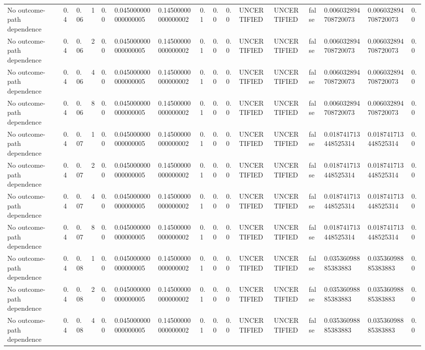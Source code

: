 \begin{tabular}{llllllllllllllll}
No outcome-path dependence & 0.4 & 0.06 & 1 & 0.0 & 0.045000000000000005 & 0.14500000000000002 & 0.1 & 0.0 & 0.0 & UNCERTIFIED & UNCERTIFIED & false & 0.006032894708720073 & 0.006032894708720073 & 0.0 \\
No outcome-path dependence & 0.4 & 0.06 & 2 & 0.0 & 0.045000000000000005 & 0.14500000000000002 & 0.1 & 0.0 & 0.0 & UNCERTIFIED & UNCERTIFIED & false & 0.006032894708720073 & 0.006032894708720073 & 0.0 \\
No outcome-path dependence & 0.4 & 0.06 & 4 & 0.0 & 0.045000000000000005 & 0.14500000000000002 & 0.1 & 0.0 & 0.0 & UNCERTIFIED & UNCERTIFIED & false & 0.006032894708720073 & 0.006032894708720073 & 0.0 \\
No outcome-path dependence & 0.4 & 0.06 & 8 & 0.0 & 0.045000000000000005 & 0.14500000000000002 & 0.1 & 0.0 & 0.0 & UNCERTIFIED & UNCERTIFIED & false & 0.006032894708720073 & 0.006032894708720073 & 0.0 \\
No outcome-path dependence & 0.4 & 0.07 & 1 & 0.0 & 0.045000000000000005 & 0.14500000000000002 & 0.1 & 0.0 & 0.0 & UNCERTIFIED & UNCERTIFIED & false & 0.018741713448525314 & 0.018741713448525314 & 0.0 \\
No outcome-path dependence & 0.4 & 0.07 & 2 & 0.0 & 0.045000000000000005 & 0.14500000000000002 & 0.1 & 0.0 & 0.0 & UNCERTIFIED & UNCERTIFIED & false & 0.018741713448525314 & 0.018741713448525314 & 0.0 \\
No outcome-path dependence & 0.4 & 0.07 & 4 & 0.0 & 0.045000000000000005 & 0.14500000000000002 & 0.1 & 0.0 & 0.0 & UNCERTIFIED & UNCERTIFIED & false & 0.018741713448525314 & 0.018741713448525314 & 0.0 \\
No outcome-path dependence & 0.4 & 0.07 & 8 & 0.0 & 0.045000000000000005 & 0.14500000000000002 & 0.1 & 0.0 & 0.0 & UNCERTIFIED & UNCERTIFIED & false & 0.018741713448525314 & 0.018741713448525314 & 0.0 \\
No outcome-path dependence & 0.4 & 0.08 & 1 & 0.0 & 0.045000000000000005 & 0.14500000000000002 & 0.1 & 0.0 & 0.0 & UNCERTIFIED & UNCERTIFIED & false & 0.03536098885383883 & 0.03536098885383883 & 0.0 \\
No outcome-path dependence & 0.4 & 0.08 & 2 & 0.0 & 0.045000000000000005 & 0.14500000000000002 & 0.1 & 0.0 & 0.0 & UNCERTIFIED & UNCERTIFIED & false & 0.03536098885383883 & 0.03536098885383883 & 0.0 \\
No outcome-path dependence & 0.4 & 0.08 & 4 & 0.0 & 0.045000000000000005 & 0.14500000000000002 & 0.1 & 0.0 & 0.0 & UNCERTIFIED & UNCERTIFIED & false & 0.03536098885383883 & 0.03536098885383883 & 0.0 \\

\end{tabular}
